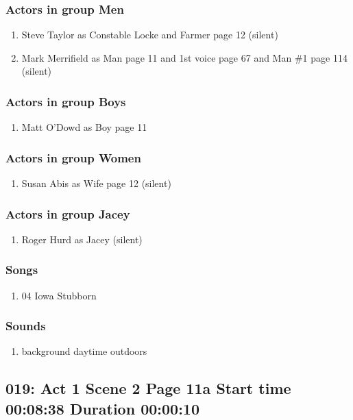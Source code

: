 \subsubsection{Actors in group Men}
\begin{enumerate}
\item Steve Taylor as Constable Locke and Farmer page 12 (silent)
\item Mark Merrifield as Man page 11 and 1st voice page 67 and Man \#1 page 114 (silent)
\end{enumerate}
\subsubsection{Actors in group Boys}
\begin{enumerate}
\item Matt O'Dowd as Boy page 11
\end{enumerate}
\subsubsection{Actors in group Women}
\begin{enumerate}
\item Susan Abis as Wife page 12 (silent)
\end{enumerate}
\subsubsection{Actors in group Jacey}
\begin{enumerate}
\item Roger Hurd as Jacey (silent)
\end{enumerate}

\subsubsection{Songs}
\begin{enumerate}
\item 04 Iowa Stubborn
\end{enumerate}\subsubsection{Sounds}
\begin{enumerate}
\item background daytime outdoors
\end{enumerate}
\subsection{019: Act 1 Scene 2 Page 11a Start time 00:08:38 Duration 00:00:10}


